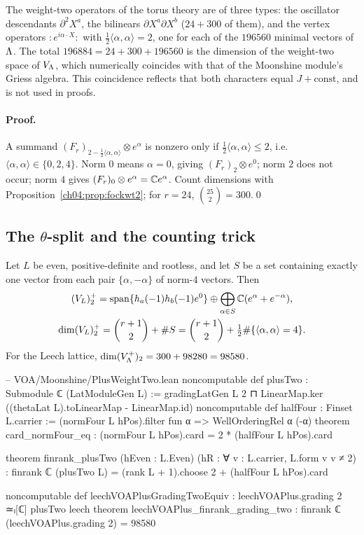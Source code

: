 \begin{physics}
The weight-two operators of the torus theory are of three types: the oscillator descendants $\partial^2X^a$, the bilinears $\partial X^a\partial X^b$ ($24+300$ of them), and the vertex operators $:\!e^{i\alpha\cdot X}\!:$ with $\tfrac12\langle\alpha,\alpha\rangle=2$, one for each of the $196560$ minimal vectors of ${\Lambda}$. The total $196884=24+300+196560$ is the dimension of the weight-two space of $V_{\Lambda}$, which numerically coincides with that of the Moonshine module's Griess algebra. This coincidence reflects that both characters equal $J+\text{const}$, and is not used in proofs.
\end{physics}

\paragraph{Proof.} A summand $(F_r)_{2-\frac12\langle\alpha,\alpha\rangle}\otimes e^\alpha$ is nonzero only if
$\tfrac12\langle\alpha,\alpha\rangle\le2$, i.e.\ $\langle\alpha,\alpha\rangle\in\{0,2,4\}$. Norm $0$ means
$\alpha=0$, giving $(F_r)_2\otimes e^0$; norm $2$ does not occur; norm $4$ gives
$(F_r)_0\otimes e^\alpha={\mathbb{C}} e^\alpha$. Count dimensions with Proposition~\ref{ch04:prop:fockwt2}; for
$r=24$, $\binom{25}{2}=300$.\qed

\subsection{The \texorpdfstring{$\theta$}{theta}-split and the counting trick}

\begin{theorem}\label{ch04:thm:plustwo}
Let $L$ be even, positive-definite and rootless, and let $S$ be a set containing exactly one
vector from each pair $\{\alpha,-\alpha\}$ of norm-$4$ vectors. Then
\begin{gather*}
  (V_L)_2^{+}=\operatorname{span}\{h_a(-1)h_b(-1)e^0\}\oplus\bigoplus_{\alpha\in S}{\mathbb{C}}(e^\alpha+e^{-\alpha}),
  \\
  \dim(V_L)_2^+=\binom{r+1}{2}+\#S=\binom{r+1}{2}+\tfrac12\#\{\langle\alpha,\alpha\rangle=4\}.
\end{gather*}
For the Leech lattice, $\dim(V_{\Lambda}^+)_2=300+98280=98580$.
\end{theorem}

\begin{leancode}
-- VOA/Moonshine/PlusWeightTwo.lean
noncomputable def plusTwo : Submodule ℂ (LatModuleGen L) :=
  gradingLatGen L 2 ⊓ LinearMap.ker ((thetaLat L).toLinearMap - LinearMap.id)
noncomputable def halfFour : Finset L.carrier :=
  (normFour L hPos).filter fun α => WellOrderingRel α (-α)
theorem card_normFour_eq : (normFour L hPos).card = 2 * (halfFour L hPos).card

theorem finrank_plusTwo (hEven : L.Even) (hR : ∀ v : L.carrier, L.form v v ≠ 2) :
    finrank ℂ (plusTwo L) = (rank L + 1).choose 2 + (halfFour L hPos).card

noncomputable def leechVOAPlusGradingTwoEquiv : leechVOAPlus.grading 2 ≃ₗ[ℂ] plusTwo leech
theorem leechVOAPlus_finrank_grading_two : finrank ℂ (leechVOAPlus.grading 2) = 98580
\end{leancode}

